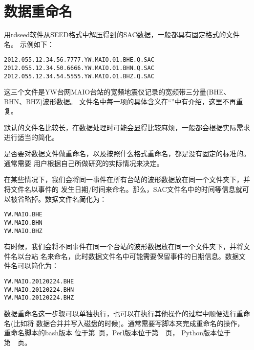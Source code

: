 \section{数据重命名}
用rdseed软件从SEED格式中解压得到的SAC数据，一般都具有固定格式的文件名。
示例如下：
\begin{verbatim}
2012.055.12.34.56.7777.YW.MAIO.01.BHE.Q.SAC
2012.055.12.34.50.6666.YW.MAIO.01.BHN.Q.SAC
2012.055.12.34.54.5555.YW.MAIO.01.BHZ.Q.SAC
\end{verbatim}
这三个文件是YW台网MAIO台站的宽频地震仪记录的宽频带三分量(BHE、BHN、BHZ)波形数据。
文件名中每一项的具体含义在``''中有介绍，这里不再重复。

默认的文件名比较长，在数据处理时可能会显得比较麻烦，一般都会根据实际需求进行适当的简化。

是否要对数据文件做重命名，以及按照什么格式重命名，都是没有固定的标准的。通常需要
用户根据自己所做研究的实际情况来决定。

在某些情况下，我们会将同一事件在所有台站的波形数据放在同一个文件夹下，并将文件名以事件的
发生日期/时间来命名。那么，SAC文件名中的时间等信息就可以被省略掉。数据文件名简化为：
\begin{verbatim}
YW.MAIO.BHE
YW.MAIO.BHN
YW.MAIO.BHZ
\end{verbatim}

有时候，我们会将不同事件在同一个台站的波形数据放在同一个文件夹下，并将文件名以台站
名来命名，此时数据文件名中可能需要保留事件的日期信息。数据文件名可以简化为：
\begin{verbatim}
YW.MAIO.20120224.BHE
YW.MAIO.20120224.BHN
YW.MAIO.20120224.BHZ
\end{verbatim}

数据重命名这一步骤可以单独执行，也可以在执行其他操作的过程中顺便进行重命名(比如将
数据合并并写入磁盘的时候)。通常需要写脚本来完成重命名的操作，重命名脚本的bash版本
位于第~\pageref{subsec:rename-in-bash}页，Perl版本位于第~\pageref{subsec:rename-in-perl}~页，
Python版本位于第~\pageref{subsec:rename-in-python}~页。
